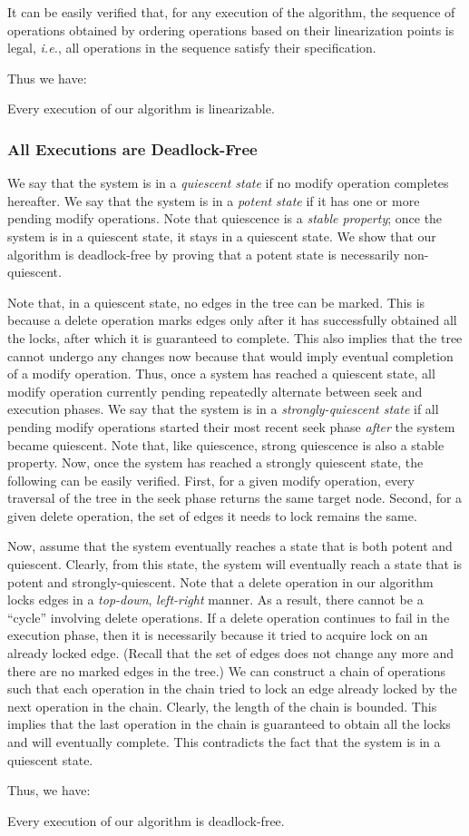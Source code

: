 It can be easily verified that, for any execution of the algorithm, the sequence of operations obtained by ordering operations based on their linearization points is legal, \emph{i.e.}, all operations in the sequence satisfy their specification. 

Thus we have:
\begin{theorem}
Every execution of our algorithm is linearizable.
\end{theorem}
			 
\subsubsection{All Executions are Deadlock-Free}	
We say that the system is in a \emph{quiescent state} if no modify operation completes hereafter. We say that the system is in a \emph{potent state} if it has one or more pending modify operations. Note that quiescence is a \emph{stable property}; once the system is in a quiescent state, it stays in a quiescent state. We show that our algorithm is deadlock-free by proving that a potent state is necessarily non-quiescent. 


Note that, in a quiescent state, no edges in the tree can be marked. This is because a delete operation marks edges only after it has successfully obtained all the locks, after which it is guaranteed to complete. This also implies that the tree cannot undergo any changes now because that would imply eventual completion of a modify operation. Thus, once a system has reached a quiescent state, all modify operation currently pending repeatedly alternate between seek and execution phases. We say that the system is in a \emph{strongly-quiescent state} if all pending modify operations started their most recent seek phase \emph{after} the system became quiescent. Note that, like quiescence, strong quiescence is also a stable property. Now, once the system has reached a strongly quiescent state, the following can be easily verified. First, for a given modify operation, every traversal of the tree in the seek phase returns the same target node. Second, for a given delete operation, the set of edges it needs to lock remains the same. 


Now, assume that the system eventually reaches a state that is both potent and quiescent. Clearly, from this state, the system will eventually reach a state that is potent and strongly-quiescent. Note that a delete operation in our algorithm locks edges in a \emph{top-down}, \emph{left-right} manner. As a result, there cannot be a ``cycle'' involving delete operations. If a delete operation continues to fail in the execution phase, then it is necessarily because it tried to acquire lock on an already locked edge. (Recall that the set of edges does not change any more and there are no marked edges in the tree.) We can construct a chain of operations such that each operation in the chain tried to lock an edge already locked by the next operation in the chain. Clearly, the length of the chain is bounded. This implies that the last operation in the chain is guaranteed to obtain all the locks and will eventually complete. This contradicts the fact that the system is in a quiescent state. 


Thus, we have:
\begin{theorem}
Every execution of our algorithm is deadlock-free.
\end{theorem}
